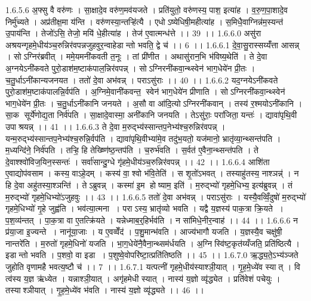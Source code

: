 1.6.5.6
अ॒फ्सु वै वरु॑णः । सा॒क्षादे॒व वरु॑ण॒मव॑यजते । प्रति॑युतो॒ वरु॑णस्य॒ पाश॒ इत्या॑ह । व॒रु॒ण॒पा॒शादे॒व निर्मु॑च्यते । अप्र॑तीक्ष॒मा य॑न्ति । वरु॑णस्या॒न्तऱ्हि॑त्यै । एधोऽष्येधिषी॒महीत्या॑ह । स॒मिधै॒वाग्निन्न॑म॒स्यन्त॑ उ॒पाय॑न्ति । तेजो॑ऽसि॒ तेजो॒ मयि॑ धे॒हीत्या॑ह । तेज॑ ए॒वात्मन्ध॑त्ते ।। 39 ।।
1.6.6.0
असु॑रा अश्रयन्गृहमे॒धीय॑ञ्च॒रुन्निर॑वपन्नजुहवुर॒न्वाहेडान्तो भवति॒ द्वे च॑ ।। 6 ।।
1.6.6.1
दे॒वा॒सु॒रास्सय्यँ॑त्ता आसन्न् । सोऽग्निर॑ब्रवीत् । ममे॒यमनी॑कवती त॒नूः । तां प्री॑णीत । अथासु॑रान॒भि भ॑विष्य॒थेति॑ । ते दे॒वा अ॒ग्नयेऽनी॑कवते पुरो॒डाश॑म॒ष्टाक॑पाल॒न्निर॑वपन्न् । सोऽग्निरनी॑कवा॒न्थ्स्वेन॑ भाग॒धेये॑न प्री॒तः । च॒तु॒र्धाऽनी॑कान्यजनयत । ततो॑ दे॒वा अभ॑वन्न् । पराऽसु॑राः ।। 40 ।।
1.6.6.2
यद॒ग्नयेऽनी॑कवते पुरो॒डाश॑म॒ष्टाक॑पालन्नि॒र्वप॑ति । अ॒ग्निमे॒वानी॑कवन्त॒॒ स्वेन॑ भाग॒धेये॑न प्रीणाति । सोऽग्निरनी॑कवा॒न्थ्स्वेन॑ भाग॒धेये॑न प्री॒तः । च॒तु॒र्धाऽनी॑कानि जनयते । अ॒सौ वा आ॑दि॒त्योऽग्निरनी॑कवान् । तस्य॑ र॒श्मयोऽनी॑कानि । सा॒क सूर्ये॑णोद्य॒ता निर्व॑पति । सा॒क्षादे॒वास्मा॒ अनी॑कानि जनयति । तेऽसु॑राः॒ परा॑जिता॒ यन्तः॑ । द्यावा॑पृथि॒वी उपाश्रयन्न् ।। 41 ।।
1.6.6.3
ते दे॒वा म॒रुद्भ्य॑स्सान्तप॒नेभ्य॑श्च॒रुन्निर॑वपन्न् । यन्म॒रुद्भ्य॑स्सान्तप॒नेभ्य॑श्च॒रुन्नि॒र्वप॑ति । द्यावा॑पृथि॒वीभ्या॑मे॒व तदु॑भ॒यतो॒ यज॑मानो॒ भ्रातृ॑व्या॒न्थ्सन्त॑पति । म॒ध्यन्दि॑ने॒ निर्व॑पति । तऱ्हि॒ हि तेख्ष्णि॑ष्ठ॒न्तप॑ति । च॒रुर्भ॑वति । स॒र्वत॑ ए॒वैना॒न्थ्सन्त॑पति । ते दे॒वाश्श्वो॑विज॒यिन॒स्सन्तः॑ । सर्वा॑सान्दु॒ग्धे गृ॑हमे॒धीय॑ञ्च॒रुन्निर॑वपन्न् ।। 42 ।।
1.6.6.4
आशि॑ता ए॒वाद्योप॑वसाम । कस्य॒ वाऽहे॒दम् । कस्य॑ वा॒ श्वो भ॑वि॒तेति॑ । स शृ॒तो॑ऽभवत् । तस्याहु॑तस्य॒ नाश्ञन्न्॑ । न हि दे॒वा अहु॑तस्या॒श्ञन्ति॑ । तेऽब्रुवन्न् । कस्मा॑ इ॒म होष्याम॒ इति॑ । म॒रुद्भ्यो॑ गृहमे॒धिभ्य॒ इत्य॑ब्रुवन्न् । तं म॒रुद्भ्यो॑ गृहमे॒धिभ्यो॑ऽजुहवुः ।। 43 ।।
1.6.6.5
ततो॑ दे॒वा अभ॑वन्न् । पराऽसु॑राः । यस्यै॒वव्विँ॒दुषो॑ म॒रुद्भ्यो॑ गृहमे॒धिभ्यो॑ गृ॒हे जुह्व॑ति । भव॑त्या॒त्मना । पराऽस्य॒ भ्रातृ॑व्यो भवति । यद्वै य॒ज्ञस्य॑ पाक॒त्रा क्रि॒यते । प॒श॒व्य॑न्तत् । पा॒क॒त्रा वा ए॒तत्क्रि॑यते । यन्नेध्माब॒र्॒हिर्भव॑ति । न सा॑मिधे॒नीर॒न्वाह॑ ।। 44 ।।
1.6.6.6
न प्र॑या॒जा इ॒ज्यन्ते । नानू॑या॒जाः । य ए॒वव्वेँद॑ । प॒शु॒मान्भ॑वति । आज्य॑भागौ यजति । य॒ज्ञस्यै॒व चक्षु॑षी॒ नान्तरे॑ति । म॒रुतो॑ गृहमे॒धिनो॑ यजति । भा॒ग॒धेये॑नै॒वैना॒न्थ्सम॑र्धयति । अ॒ग्निस्वि॑ष्ट॒कृत॑य्यँजति॒ प्रति॑ष्ठित्यै । इडान्तो भवति । प॒शवो॒ वा इडा । प॒शुष्वे॒वोपरि॑ष्टा॒त्प्रति॑तिष्ठति ।। 45 ।।
1.6.7.0
ऋ॒द्ध्य॒ते॒ऽभ्य॑ञ्जते जुहोति वृणामहै भवत्य॒ष्टौ च॑ ।। 7 ।।
1.6.7.1
यत्पत्नी॑ गृहमे॒धीय॑स्याश्ञी॒यात् । गृ॒ह॒मे॒ध्ये॑व स्यात् । वि त्व॑स्य य॒ज्ञ ऋ॑ध्येत । यन्नाश्ञी॒यात् । अगृ॑हमेधी स्यात् । नास्य॑ य॒ज्ञो व्यृ॑द्ध्येत । प्रति॑वेशं पचेयुः । तस्याश्ञीयात् । गृ॒ह॒मे॒ध्ये॑व भ॑वति । नास्य॑ य॒ज्ञो व्यृ॑द्ध्यते ।। 46 ।।
